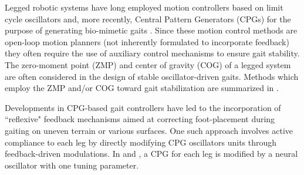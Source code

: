 
Legged robotic systems have long employed motion controllers based on limit cycle oscillators and, more recently, Central Pattern Generators (CPGs)  for the purpose of generating bio-mimetic gaits \cite{Matsuoka1985,Collins1993,Endo2004,Righetti2006,Ijspeert2008,Matos2010,Ajallooeian2013,Park2014,Fukuoka2015}. Since these motion control methods are open-loop motion planners (\IE not inherently formulated to incorporate feedback) they often require the use of auxiliary control mechanisms to ensure gait stability. The zero-moment point (ZMP) and center of gravity (COG) of a legged system are often considered in the design of stable oscillator-driven gaits. Methods which employ the ZMP and/or COG toward gait stabilization are summarized in \cite{Wieber2015}. %

Developments in CPG-based gait controllers have led to the incorporation of ``reflexive" feedback mechanisms aimed at correcting foot-placement during gaiting on uneven terrain or various surfaces. One such approach involves active compliance to each leg by directly modifying CPG oscillators units through feedback-driven modulations. In \cite{Endo2004} and \cite{Fukuoka2003}, a CPG for each leg is modified by a neural oscillator with one tuning parameter.  

